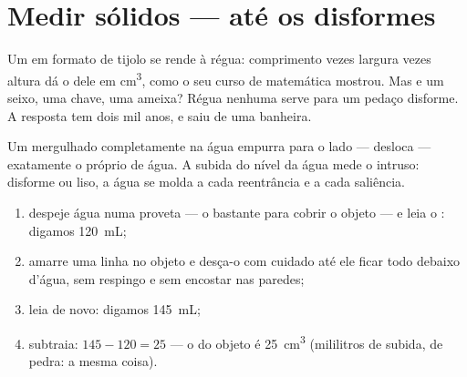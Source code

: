 \section{Medir sólidos --- até os disformes}

Um  em formato de tijolo se rende à régua: comprimento vezes
largura vezes altura dá o  dele em \unit{cm^3}, como o seu
curso de matemática mostrou. Mas e um seixo, uma chave, uma ameixa?
Régua nenhuma serve para um pedaço disforme. A resposta tem dois mil
anos, e saiu de uma banheira.

\begin{proposition}[Deslocamento]\label{prop:g6:mass-and-volume:displacement}
Um  mergulhado completamente na água empurra para o lado ---
desloca --- exatamente o próprio  de água. A subida do nível da
água mede o intruso: disforme ou liso, a água se molda a cada
reentrância e a cada saliência.
\end{proposition}

\begin{method}\label{met:g6:mass-and-volume:rise}
\begin{enumerate}
  \item despeje água numa proveta --- o bastante para cobrir o objeto
        --- e leia o : digamos \qty{120}{mL};
  \item amarre uma linha no objeto e desça-o com cuidado até ele
        ficar todo debaixo d'água, sem respingo e sem encostar nas
        paredes;
  \item leia de novo: digamos \qty{145}{mL};
  \item subtraia: $145 - 120 = 25$ --- o  do objeto é
        \qty{25}{cm^3} (mililitros de subida,  de
        pedra: a mesma coisa).
\end{enumerate}
\end{method}

